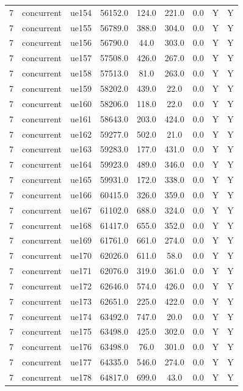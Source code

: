 \begin{table}[ht]
\begin{tabular}{|c|c|c|c|c|c|c|c|c|}
7 & concurrent & ue154 & 56152.0 & 124.0 & 221.0 & 0.0 & Y & Y \\
7 & concurrent & ue155 & 56789.0 & 388.0 & 304.0 & 0.0 & Y & Y \\
7 & concurrent & ue156 & 56790.0 & 44.0 & 303.0 & 0.0 & Y & Y \\
7 & concurrent & ue157 & 57508.0 & 426.0 & 267.0 & 0.0 & Y & Y \\
7 & concurrent & ue158 & 57513.0 & 81.0 & 263.0 & 0.0 & Y & Y \\
7 & concurrent & ue159 & 58202.0 & 439.0 & 22.0 & 0.0 & Y & Y \\
7 & concurrent & ue160 & 58206.0 & 118.0 & 22.0 & 0.0 & Y & Y \\
7 & concurrent & ue161 & 58643.0 & 203.0 & 424.0 & 0.0 & Y & Y \\
7 & concurrent & ue162 & 59277.0 & 502.0 & 21.0 & 0.0 & Y & Y \\
7 & concurrent & ue163 & 59283.0 & 177.0 & 431.0 & 0.0 & Y & Y \\
7 & concurrent & ue164 & 59923.0 & 489.0 & 346.0 & 0.0 & Y & Y \\
7 & concurrent & ue165 & 59931.0 & 172.0 & 338.0 & 0.0 & Y & Y \\
7 & concurrent & ue166 & 60415.0 & 326.0 & 359.0 & 0.0 & Y & Y \\
7 & concurrent & ue167 & 61102.0 & 688.0 & 324.0 & 0.0 & Y & Y \\
7 & concurrent & ue168 & 61417.0 & 655.0 & 352.0 & 0.0 & Y & Y \\
7 & concurrent & ue169 & 61761.0 & 661.0 & 274.0 & 0.0 & Y & Y \\
7 & concurrent & ue170 & 62026.0 & 611.0 & 58.0 & 0.0 & Y & Y \\
7 & concurrent & ue171 & 62076.0 & 319.0 & 361.0 & 0.0 & Y & Y \\
7 & concurrent & ue172 & 62646.0 & 574.0 & 426.0 & 0.0 & Y & Y \\
7 & concurrent & ue173 & 62651.0 & 225.0 & 422.0 & 0.0 & Y & Y \\
7 & concurrent & ue174 & 63492.0 & 747.0 & 20.0 & 0.0 & Y & Y \\
7 & concurrent & ue175 & 63498.0 & 425.0 & 302.0 & 0.0 & Y & Y \\
7 & concurrent & ue176 & 63498.0 & 76.0 & 301.0 & 0.0 & Y & Y \\
7 & concurrent & ue177 & 64335.0 & 546.0 & 274.0 & 0.0 & Y & Y \\
7 & concurrent & ue178 & 64817.0 & 699.0 & 43.0 & 0.0 & Y & Y \\

\end{tabular}
\end{table}
